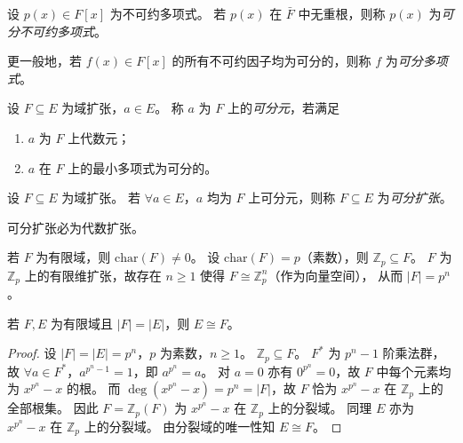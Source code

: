 \documentclass[lang=cn,a4paper,newtx]{elegantbook}
\begin{document}
\begin{definition}[可分多项式]
  设 $p(x)\in F[x]$ 为不可约多项式。
  若 $p(x)$ 在 $\bar F$ 中无重根，则称 $p(x)$ 为\emph{可分不可约多项式}。

  更一般地，若 $f(x)\in F[x]$ 的所有不可约因子均为可分的，则称 $f$ 为\emph{可分多项式}。
\end{definition}

\begin{definition}[可分元]
  设 $F\subseteq E$ 为域扩张，$a\in E$。
  称 $a$ 为 $F$ 上的\emph{可分元}，若满足
  \begin{enumerate}
    \item $a$ 为 $F$ 上代数元；
    \item $a$ 在 $F$ 上的最小多项式为可分的。
  \end{enumerate}
\end{definition}

\begin{definition}[可分扩张]
  设 $F\subseteq E$ 为域扩张。
  若 $\forall a\in E$，$a$ 均为 $F$ 上可分元，则称 $F\subseteq E$ 为\emph{可分扩张}。
\end{definition}

\begin{remark}
  可分扩张必为代数扩张。
\end{remark}

\begin{remark}
  若 $F$ 为有限域，则 $\mathrm{char}(F)\ne 0$。
  设 $\mathrm{char}(F)=p$（素数），则 $\mathbb{Z}_p\subseteq F$。
  $F$ 为 $\mathbb{Z}_p$ 上的有限维扩张，故存在 $n\ge 1$ 使得 $F\cong\mathbb{Z}_p^n$（作为向量空间），
  从而 $|F|=p^n$。
\end{remark}

\begin{proposition}
  若 $F,E$ 为有限域且 $|F|=|E|$，则 $E\cong F$。
\end{proposition}

\begin{proof}
  设 $|F|=|E|=p^n$，$p$ 为素数，$n\ge 1$。
  $\mathbb{Z}_p\subseteq F$。
  $F^*$ 为 $p^n-1$ 阶乘法群，故 $\forall a\in F^*$，$a^{p^n-1}=1$，即 $a^{p^n}=a$。
  对 $a=0$ 亦有 $0^{p^n}=0$，故 $F$ 中每个元素均为 $x^{p^n}-x$ 的根。
  而 $\deg(x^{p^n}-x)=p^n=|F|$，故 $F$ 恰为 $x^{p^n}-x$ 在 $\mathbb{Z}_p$ 上的全部根集。
  因此 $F=\mathbb{Z}_p(F)$ 为 $x^{p^n}-x$ 在 $\mathbb{Z}_p$ 上的分裂域。
  同理 $E$ 亦为 $x^{p^n}-x$ 在 $\mathbb{Z}_p$ 上的分裂域。
  由分裂域的唯一性知 $E\cong F$。
\end{proof}
\end{document}
